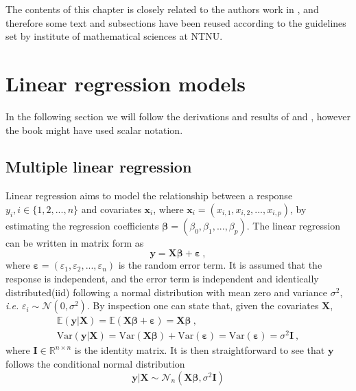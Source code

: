 
The contents of this chapter is closely related to the authors work in \citet{Arnstad}, and therefore some text and subsections have been reused according to the guidelines set by institute of mathematical sciences at NTNU.

\section{Linear regression models}
In the following section we will follow the derivations and results of \citet{GLMM_book} and \citet{GLMM_book_old}, however the book might have used scalar notation.
\subsection{Multiple linear regression}
Linear regression aims to model the relationship between a response $y_i, i\in\{1, 2, ..., n\}$ and covariates $\mathbf{x}_i$, where $\mathbf{x}_i = (x_{i, 1}, x_{i, 2}, ..., x_{i, p})$, by estimating the regression coefficients $\boldsymbol{\beta} = (\beta_0, \beta_1, ..., \beta_p)$. The linear regression can be written in matrix form as
\begin{equation}
    \label{eq:lin_reg}
    \mathbf{y} = \mathbf{X}\boldsymbol{\beta} + \boldsymbol{\varepsilon} \ , 
\end{equation}
where $\boldsymbol{\varepsilon}=(\varepsilon_1, \varepsilon_2, ..., \varepsilon_n)$ is the random error term. It is assumed that the response is independent, and the error term is independent and identically distributed(iid) following a normal distribution with mean zero and variance $\sigma^2$, \textit{i.e.} $\varepsilon_i \sim \mathcal{N}(0, \sigma^2)$. 
By inspection one can state that, given the covariates $\mathbf{X}$, 
\begin{equation}
    \begin{split}
        \mathbb{E}(\mathbf{y} \lvert \mathbf{X}) = \mathbb{E}(\mathbf{X}\boldsymbol{\beta} + \boldsymbol{\varepsilon}) = \mathbf{X}\boldsymbol{\beta} \ ,  \\
        \text{Var}(\mathbf{y} \lvert \mathbf{X}) = \text{Var}(\mathbf{X}\boldsymbol{\beta}) + \text{Var}(\boldsymbol{\varepsilon}) = \text{Var}(\boldsymbol{\varepsilon}) = \sigma^2\mathbf{I} \ ,
    \end{split}
\end{equation}
where $\mathbf{I} \in \mathbb{R}^{n \times n}$ is the identity matrix. 
It is then straightforward to see that $\mathbf{y}$ follows the conditional normal distribution
\begin{equation}
    \mathbf{y} \lvert \mathbf{X} \sim \mathcal{N}_n(\mathbf{X}\boldsymbol{\beta}, \sigma^2 \mathbf{I})
\end{equation}
